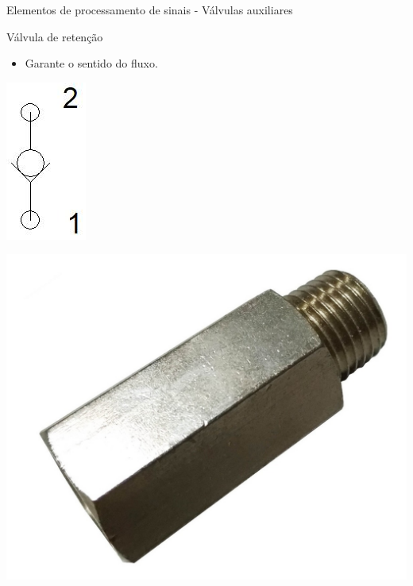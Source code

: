 \begin{frame}{Elementos de processamento de sinais - Válvulas auxiliares}
	\begin{block}{Válvula de retenção}
		\begin{itemize}
			\item Garante o sentido do fluxo.
		\end{itemize}
	\end{block}

	\medskip
	
	\begin{minipage}[c]{0.48\linewidth}
		\centering
		\includegraphics[height=0.7\textheight]{Figuras/Ch14/fig21}
	\end{minipage}
	\hfill
	\begin{minipage}[c]{0.48\linewidth}
		\centering
		\includegraphics[width=1\linewidth]{Figuras/Ch14/fig22}
	\end{minipage}
\end{frame}


